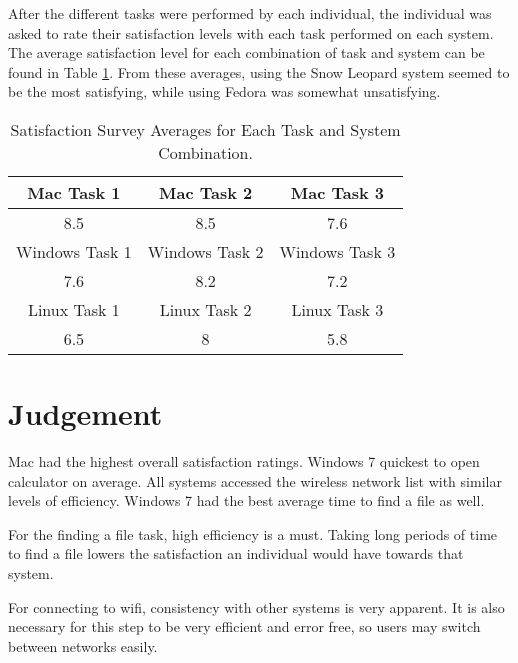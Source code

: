\documentclass[11pt,letterpaper]{report}
\begin{document}
After the different tasks were performed by each individual, the individual was asked to rate their satisfaction levels with each task performed on each system. The average satisfaction level for each combination of task and system can be found in Table \ref{Satisfaction}. From these averages, using the Snow Leopard system seemed to be the most satisfying, while using Fedora was somewhat unsatisfying.

\begin{table}
    \centering
    \begin{tabular}{| c | c | c |}
        \hline
        Mac Task 1 &  Mac Task 2 & Mac Task 3 \\ \hline
        8.5 & 8.5 & 7.6 \\
        \hline
        \hline
        Windows Task 1 & Windows Task 2 & Windows Task 3 \\ \hline
        7.6 & 8.2 & 7.2 \\
        \hline
        \hline
        
        Linux Task 1 & Linux Task 2 & Linux Task 3 \\ \hline 
        6.5 & 8 & 5.8 \\
        \hline
    \end{tabular}
    \caption{Satisfaction Survey Averages for Each Task and System Combination.}
    \label{Satisfaction}    
\end{table}

\section{Judgement}
Mac had the highest overall satisfaction ratings. Windows 7 quickest to open calculator on average. All systems accessed the wireless network list with similar levels of efficiency. Windows 7 had the best average time to find a file as well. 

For the finding a file task, high efficiency is a must. Taking long periods of time to find a file lowers the satisfaction an individual would have towards that system. 

For connecting to wifi, consistency with other systems is very apparent. It is also necessary for this step to be very efficient and error free, so users may switch between networks easily. 
\end{document}
